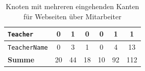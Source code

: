 \begin{table}[htb]
\begin{tabular}{|l|c|c|c|c|c|c|}
            \texttt{Teacher}                               & 0             & 1              & 0               & 0             & 1              & 1             \\ \hline
            \texttt{TeacherName}                           & 0             & 3              & 1               & 0             & 4              & 13            \\ \hline
            \hline
            \textbf{Summe}                        & 20            & 44             & 18              & 10            & 92             & 112           \\ \hline
        \end{tabular}
        \caption{Knoten mit mehreren eingehenden Kanten für Webseiten über Mitarbeiter}
        \label{table:findingsTeachersFiguresSharedNodes}
    \end{table}

